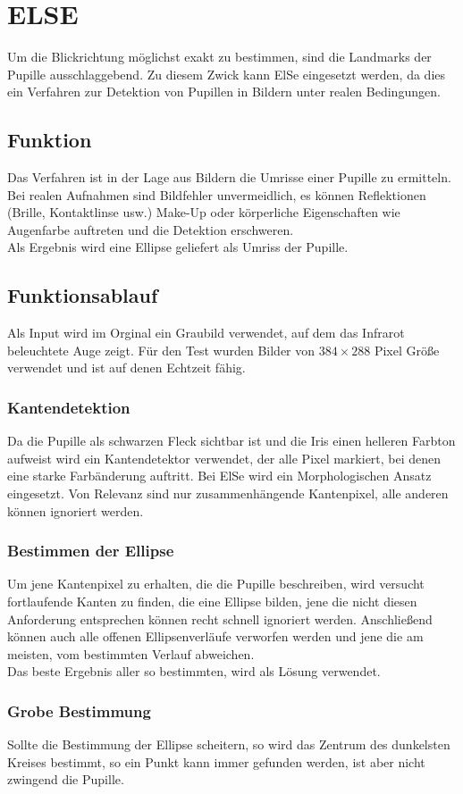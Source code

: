 \section{ELSE}
Um die Blickrichtung möglichst exakt zu bestimmen, sind die Landmarks der Pupille ausschlaggebend. Zu diesem Zwick kann ElSe eingesetzt werden, da dies ein Verfahren zur Detektion von Pupillen in Bildern unter realen Bedingungen.
\subsection{Funktion}
Das Verfahren ist in der Lage aus Bildern die Umrisse einer Pupille zu ermitteln. Bei realen Aufnahmen sind Bildfehler unvermeidlich, es können Reflektionen (Brille, Kontaktlinse usw.) Make-Up oder körperliche Eigenschaften wie Augenfarbe auftreten und die Detektion erschweren.\\
Als Ergebnis wird eine Ellipse geliefert als Umriss der Pupille.
\subsection{Funktionsablauf}
Als Input wird im Orginal ein Graubild verwendet, auf dem das Infrarot beleuchtete Auge zeigt. Für den Test wurden Bilder von $384\times 288$ Pixel Größe verwendet und ist auf denen Echtzeit fähig.
\subsubsection{Kantendetektion}
Da die Pupille als schwarzen Fleck sichtbar ist und die Iris einen helleren Farbton aufweist wird ein Kantendetektor verwendet, der alle Pixel markiert, bei denen eine starke Farbänderung auftritt. Bei ElSe wird ein Morphologischen Ansatz eingesetzt. Von Relevanz sind nur zusammenhängende Kantenpixel, alle anderen können ignoriert werden.
\subsubsection{Bestimmen der Ellipse}
Um jene Kantenpixel zu erhalten, die die Pupille beschreiben, wird versucht fortlaufende Kanten zu finden, die eine Ellipse bilden, jene die nicht diesen Anforderung entsprechen können recht schnell ignoriert werden. Anschließend können auch alle offenen Ellipsenverläufe verworfen werden und jene die am meisten, vom bestimmten Verlauf abweichen.\\
Das beste Ergebnis aller so bestimmten, wird als Lösung verwendet.
\subsubsection{Grobe Bestimmung}
Sollte die Bestimmung der Ellipse scheitern, so wird das Zentrum des dunkelsten Kreises bestimmt, so ein Punkt kann immer gefunden werden, ist aber nicht zwingend die Pupille.
